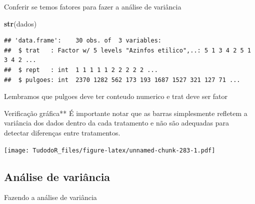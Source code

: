 \documentclass[
]{book}
\newenvironment{Shaded}{\begin{snugshade}}{\end{snugshade}}
\newcommand{\KeywordTok}[1]{\textcolor[rgb]{0.13,0.29,0.53}{\textbf{#1}}}
\newcommand{\NormalTok}[1]{#1}
\newcommand{\OperatorTok}[1]{\textcolor[rgb]{0.81,0.36,0.00}{\textbf{#1}}}
\newcommand{\StringTok}[1]{\textcolor[rgb]{0.31,0.60,0.02}{#1}}
\begin{document}
Conferir se temos fatores para fazer a análise de variância

\begin{Shaded}
\begin{Highlighting}[]
\KeywordTok{str}\NormalTok{(dados)}
\end{Highlighting}
\end{Shaded}

\begin{verbatim}
## 'data.frame':    30 obs. of  3 variables:
##  $ trat   : Factor w/ 5 levels "Azinfos etilico",..: 5 1 3 4 2 5 1 3 4 2 ...
##  $ rept   : int  1 1 1 1 1 2 2 2 2 2 ...
##  $ pulgoes: int  2370 1282 562 173 193 1687 1527 321 127 71 ...
\end{verbatim}

Lembramos que pulgoes deve ter conteudo numerico e trat deve ser fator

\begin{Shaded}
\end{Shaded}

Verificação gráfica**
É importante notar que as barras simplesmente refletem a variância dos dados dentro da cada tratamento e não são adequadas para detectar diferenças entre tratamentos.

\begin{Shaded}
\end{Shaded}

\texttt{[image: TudodoR\_files/figure-latex/unnamed-chunk-283-1.pdf]}

\hypertarget{anuxe1lise-de-variuxe2ncia}{%
\subsection{Análise de variância}\label{anuxe1lise-de-variuxe2ncia}}

Fazendo a análise de variância

\begin{Shaded}
\end{Shaded}
\end{document}
